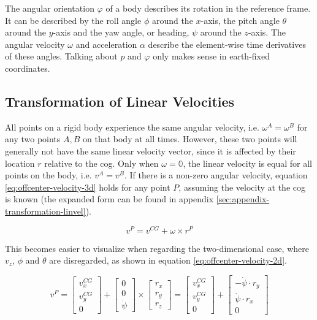 The angular orientation $\varphi$ of a body describes its rotation in the reference frame. It can be described by the roll angle $\phi$ around the $x$-axis, the pitch angle $\theta$ around the $y$-axis and the yaw angle, or heading, $\psi$ around the $z$-axis. The angular velocity $\omega$ and acceleration $\alpha$ describe the element-wise time derivatives of these angles. Talking about $p$ and $\varphi$ only makes sense in earth-fixed coordinates.


\subsection{Transformation of Linear Velocities}
All points on a rigid body experience the same angular velocity, i.e. $\omega^A = \omega^B$ for any two points $A, B$ on that body at all times. However, these two points will generally not have the same linear velocity vector, since it is affected by their location $r$ relative to the \gls{cog}. Only when $\omega = \mathbb{0}$, the linear velocity is equal for all points on the body, i.e. $v^A = v^B$. If there is a non-zero angular velocity, equation \ref{eq:offcenter-velocity-3d} holds for any point $P$, assuming the velocity at the \gls{cog} is known (the expanded form can be found in appendix \ref{sec:appendix-transformation-linvel}).

\begin{equation}\label{eq:offcenter-velocity-3d}%
v^P = v^{CG} + \omega \times r^P%
\end{equation}

This becomes easier to visualize when regarding the two-dimensional case, where $v_z$, $\dot{\phi}$ and $\dot{\theta}$ are disregarded, as shown in equation \ref{eq:offcenter-velocity-2d}.

\begin{equation}\label{eq:offcenter-velocity-2d}%
v^P%
= \begin{bmatrix}v_x^{CG} \\ v_y^{CG} \\ 0\end{bmatrix} + \begin{bmatrix}0 \\ 0 \\ \dot{\psi}\end{bmatrix} \times \begin{bmatrix}r_x \\ r_y \\ r_z\end{bmatrix}%
= \begin{bmatrix}v_x^{CG} \\ v_y^{CG} \\ 0\end{bmatrix} + \begin{bmatrix}-\dot{\psi} \cdot r_y \\ \dot{\psi} \cdot r_x \\ 0\end{bmatrix}%
 \end{equation}

